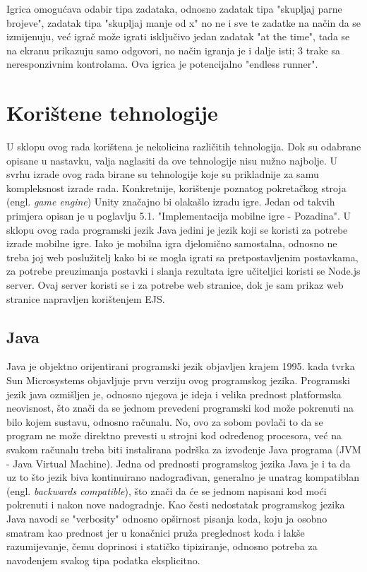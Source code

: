 \documentclass[times, utf8, zavrsni]{fer}
\begin{document}
Igrica omogućava odabir tipa zadataka, odnosno zadatak tipa "skupljaj parne brojeve", zadatak tipa "skupljaj manje od x" no ne i sve te zadatke na način da se izmijenuju, već igrač može igrati isključivo jedan zadatak "at the time", tada se na ekranu 
prikazuju samo odgovori, no način igranja je i dalje isti; 3 trake sa neresponzivnim kontrolama. Ova igrica je potencijalno "endless runner". 

\chapter{Korištene tehnologije}
U sklopu ovog rada korištena je nekolicina različitih tehnologija. Dok su odabrane opisane u nastavku, valja naglasiti da ove tehnologije nisu nužno najbolje. U svrhu izrade ovog rada birane su tehnologije koje su prikladnije za samu kompleksnost izrade rada.
Konkretnije, korištenje poznatog pokretačkog stroja (engl. \textit{game engine}) Unity značajno bi olakašlo izradu igre. Jedan od takvih primjera opisan je u poglavlju 5.1. "Implementacija mobilne igre - Pozadina". 
U sklopu ovog rada programski jezik Java jedini je jezik koji se koristi za potrebe izrade mobilne igre. Iako je mobilna igra djelomično samostalna, odnosno ne treba joj web poslužitelj kako bi se mogla igrati sa pretpostavljenim postavkama, za potrebe 
preuzimanja postavki i slanja rezultata igre učiteljici koristi se Node.js server. Ovaj server koristi se i za potrebe web stranice, dok je sam prikaz web stranice napravljen korištenjem EJS.


	\section{Java}
	Java je objektno orijentirani programski jezik objavljen krajem 1995. kada tvrka Sun Microsystems objavljuje prvu verziju ovog programskog jezika. Programski jezik java ozmišljen je, odnosno njegova je ideja i velika prednost platformska neovisnost,
	što znači da se jednom prevedeni programski kod može pokrenuti na bilo kojem sustavu, odnosno računalu. No, ovo za sobom povlači to da se program ne može direktno prevesti u strojni kod određenog procesora, već na svakom računalu treba biti
	instalirana podrška za izvođenje Java programa (JVM - Java Virtual Machine). 
	Jedna od prednosti programskog jezika Java je i ta da uz to što jezik biva kontinuirano nadograđivan, generalno je unatrag kompatiblan (engl. \textit{backwards compatible}), što znači da će se jednom napisani kod moći pokrenuti i nakon nove nadogradnje.
	Kao česti nedostatak programskog jezika Java navodi se "verbosity" odnosno opširnost pisanja koda, koju ja osobno smatram kao prednost jer u konačnici pruža preglednost koda i lakše razumijevanje, čemu doprinosi i statičko tipiziranje, odnosno 
	potreba za navođenjem svakog tipa podatka eksplicitno. 
	
\end{document}
